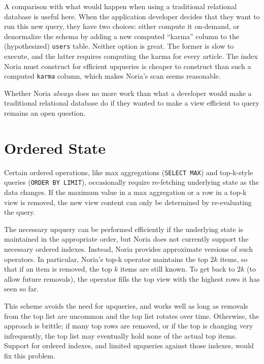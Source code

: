 A comparison with what would happen when using a traditional relational database
is useful here. When the application developer decides that they want to run
this new query, they have two choices: either compute it on-demand, or
denormalize the schema by adding a new computed ``karma'' column to the
(hypothesized) \texttt{users} table. Neither option is great. The former is slow
to execute, and the latter requires computing the karma for every article.
The index Noria must construct for efficient upqueries is cheaper to construct
than such a computed \texttt{karma} column, which makes Noria's scan seems
reasonable.


Whether Noria \emph{always} does no more work than what a developer would
make a traditional relational database do if they wanted to make a view
efficient to query remains an open question.

\section{Ordered State}
\label{s:disc:ordered}

Certain ordered operations, like max aggregations (\texttt{SELECT MAX}) and
top-k-style queries (\texttt{ORDER BY LIMIT}), occasionally require re-fetching
underlying state as the data changes. If the maximum value in a max aggregation
or a row in a top-k view is removed, the new view content can only be determined
by re-evaluating the query.

The necessary upquery can be performed efficiently if the underlying state is
maintained in the appropriate order, but Noria does not currently support the
necessary ordered indexes. Instead, Noria provides approximate versions of such
operators. In particular, Noria's top-k operator maintains the top $2k$ items,
so that if an item is removed, the top $k$ items are still known. To get back to
$2k$ (to allow future removals), the operator fills the top view with the
highest rows it has seen so far.

This scheme avoids the need for upqueries, and works well as long as removals
from the top list are uncommon and the top list rotates over time. Otherwise,
the approach is brittle; if many top rows are removed, or if the top is changing
very infrequently, the top list may eventually hold none of the actual top
items. Support for ordered indexes, and limited upqueries against those indexes,
would fix this problem.

